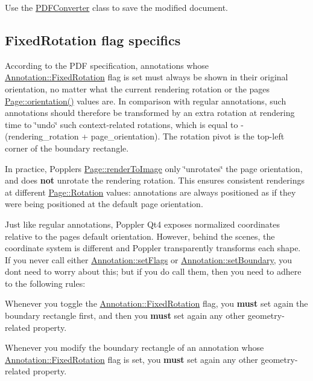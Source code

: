 Use the \hyperlink{class_poppler_1_1_p_d_f_converter}{P\+D\+F\+Converter} class to save the modified document.\hypertarget{class_poppler_1_1_annotation_annotFixedRotation}{}\subsection{Fixed\+Rotation flag specifics}\label{class_poppler_1_1_annotation_annotFixedRotation}
According to the P\+DF specification, annotations whose \hyperlink{class_poppler_1_1_annotation_a8c2dca956649e4ce454361d5b75dc270a61bee11edae896858409dd65d14d3a70}{Annotation\+::\+Fixed\+Rotation} flag is set must always be shown in their original orientation, no matter what the current rendering rotation or the page\textquotesingle{}s \hyperlink{class_poppler_1_1_page_a168a4a6c452eb365a4cd7170d6a98e29}{Page\+::orientation()} values are. In comparison with regular annotations, such annotations should therefore be transformed by an extra rotation at rendering time to \char`\"{}undo\char`\"{} such context-\/related rotations, which is equal to {\ttfamily -\/(rendering\+\_\+rotation + page\+\_\+orientation)}. The rotation pivot is the top-\/left corner of the boundary rectangle.

In practice, Poppler\textquotesingle{}s \hyperlink{class_poppler_1_1_page_a204d8018439dabf54b3b6f80be843dc3}{Page\+::render\+To\+Image} only \char`\"{}unrotates\char`\"{} the page orientation, and does {\bfseries not} unrotate the rendering rotation. This ensures consistent renderings at different \hyperlink{class_poppler_1_1_page_a9c9a4e1bc301cd2ab4eac0b51f0dc0ec}{Page\+::\+Rotation} values\+: annotations are always positioned as if they were being positioned at the default page orientation.

Just like regular annotations, Poppler Qt4 exposes normalized coordinates relative to the page\textquotesingle{}s default orientation. However, behind the scenes, the coordinate system is different and Poppler transparently transforms each shape. If you never call either \hyperlink{class_poppler_1_1_annotation_abb788875ed4ed5e593e979afc70555db}{Annotation\+::set\+Flags} or \hyperlink{class_poppler_1_1_annotation_ad7632d611ff26ec76cc42d301d2296e9}{Annotation\+::set\+Boundary}, you don\textquotesingle{}t need to worry about this; but if you do call them, then you need to adhere to the following rules\+:
\begin{DoxyItemize}
\item Whenever you toggle the \hyperlink{class_poppler_1_1_annotation_a8c2dca956649e4ce454361d5b75dc270a61bee11edae896858409dd65d14d3a70}{Annotation\+::\+Fixed\+Rotation} flag, you {\bfseries must} set again the boundary rectangle first, and then you {\bfseries must} set again any other geometry-\/related property.
\item Whenever you modify the boundary rectangle of an annotation whose \hyperlink{class_poppler_1_1_annotation_a8c2dca956649e4ce454361d5b75dc270a61bee11edae896858409dd65d14d3a70}{Annotation\+::\+Fixed\+Rotation} flag is set, you {\bfseries must} set again any other geometry-\/related property.
\end{DoxyItemize}

